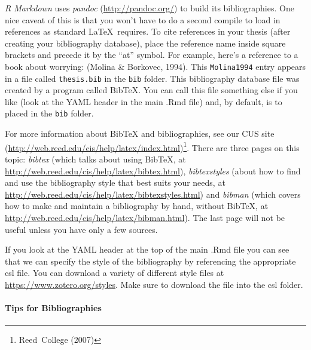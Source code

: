 \documentclass[12pt,twoside]{reedthesis}
\begin{document}
  \emph{R Markdown} uses \emph{pandoc} (\url{http://pandoc.org/}) to build
  its bibliographies. One nice caveat of this is that you won't have to do
  a second compile to load in references as standard \LaTeX~requires. To
  cite references in your thesis (after creating your bibliography
  database), place the reference name inside square brackets and precede
  it by the ``at'' symbol. For example, here's a reference to a book about
  worrying: (Molina \& Borkovec, 1994). This \texttt{Molina1994} entry
  appears in a file called \texttt{thesis.bib} in the \texttt{bib} folder.
  This bibliography database file was created by a program called BibTeX.
  You can call this file something else if you like (look at the YAML
  header in the main .Rmd file) and, by default, is to placed in the
  \texttt{bib} folder.
  
  For more information about BibTeX and bibliographies, see our CUS site
  (\url{http://web.reed.edu/cis/help/latex/index.html})\footnote{Reed~College
    (2007)}. There are three pages on this topic: \emph{bibtex} (which
  talks about using BibTeX, at
  \url{http://web.reed.edu/cis/help/latex/bibtex.html}),
  \emph{bibtexstyles} (about how to find and use the bibliography style
  that best suits your needs, at
  \url{http://web.reed.edu/cis/help/latex/bibtexstyles.html}) and
  \emph{bibman} (which covers how to make and maintain a bibliography by
  hand, without BibTeX, at
  \url{http://web.reed.edu/cis/help/latex/bibman.html}). The last page
  will not be useful unless you have only a few sources.
  
  If you look at the YAML header at the top of the main .Rmd file you can
  see that we can specify the style of the bibliography by referencing the
  appropriate csl file. You can download a variety of different style
  files at \url{https://www.zotero.org/styles}. Make sure to download the
  file into the csl folder.
  
  \paragraph{Tips for Bibliographies}\label{tips-for-bibliographies}
  
\end{document}
